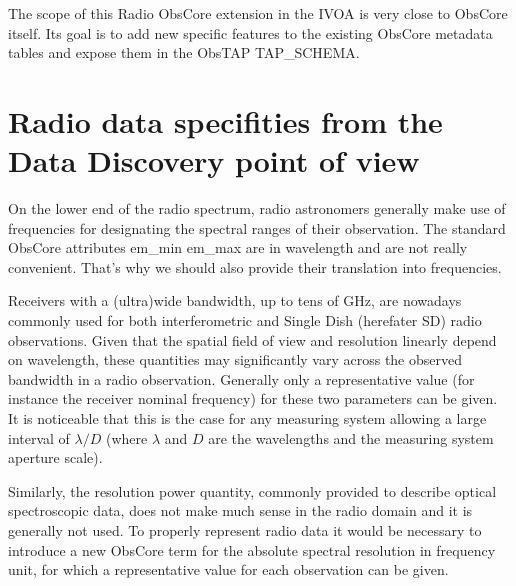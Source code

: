 \documentclass[11pt,a4paper]{ivoa}
\begin{document}


The scope of this Radio ObsCore extension in the IVOA is very close to ObsCore itself.
Its goal is to add new specific features to the existing ObsCore metadata tables and expose
them in the ObsTAP TAP\_SCHEMA.





\section{Radio data specifities from the Data Discovery point of view}
\label{sec:specificities}

On the lower end of the radio spectrum, radio astronomers generally make use of
frequencies for designating the spectral ranges of their observation. The standard
ObsCore attributes em\_min em\_max  are in wavelength and are not really convenient.
That's why we should also provide their translation into frequencies.

Receivers with a (ultra)wide bandwidth, up to tens of GHz, are
nowadays commonly used for both interferometric and Single Dish (herefater SD) radio observations.
Given that the spatial field of view and resolution linearly depend on wavelength, these quantities may significantly vary across the observed bandwidth in a radio observation.
Generally only a representative value (for instance the
receiver nominal frequency) for these two parameters can be given. It is
noticeable that this is the case for any measuring system allowing a large interval of
$\lambda/D$ (where $\lambda$ and $D$ are the wavelengths and the measuring system
aperture scale).

Similarly, the resolution power quantity, commonly provided to describe optical spectroscopic data, does not make much sense in the radio domain and it is generally not used.
To properly represent radio data it would be necessary to introduce a new ObsCore term for the absolute spectral resolution in frequency unit, for which a representative value for each observation can be given.
\end{document}
